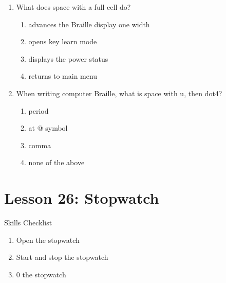 \documentclass[10pt,letterpaper,twoside]{report}
\begin{document}
{{{{\begin{enumerate}
\begin{enumerate}
		      \item opens the spelling checker
		            
		      \item none of the above
		            
		            
	      \end{enumerate}
	\item What does space with a full cell do?
	      
	      \begin{enumerate}
		      \item advances the Braille display one width
		            
		      \item opens key learn mode
		            
		      \item displays the power status
		            
		      \item returns to main menu
		            
		            
	      \end{enumerate}
	\item When writing computer Braille, what is space with u, then dot4?
	      
	      \begin{enumerate}
		      \item period
		            
		      \item at @ symbol
		            
		      \item comma
		            
		      \item none of the above
	      \end{enumerate}
\end{enumerate}
\section*{Lesson 26: Stopwatch}
Skills Checklist



\begin{enumerate}
	\item Open the stopwatch
	      
	\item Start and stop the stopwatch
	      
	\item 0 the stopwatch
	      

\end{enumerate}}}}}
\end{document}
